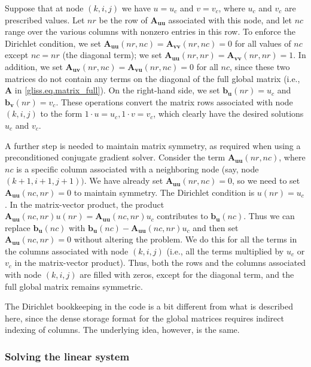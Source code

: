 Suppose that at node $(k,i,j)$ we have $u = u_c$ and $v = v_c$, where $u_c$ and $v_c$ are prescribed values.  
Let $nr$ be the row of $\mathbf{A_{uu}}$ associated with this node, and let $nc$ range over the various
columns with nonzero entries in this row.
To enforce the Dirichlet condition, we set $\mathbf{A_{uu}}(nr,nc) = \mathbf{A_{vv}}(nr,nc) = 0$ for all
values of $nc$ except $nc = nr$ (the diagonal term); we set $\mathbf{A_{uu}}(nr,nr) = \mathbf{A_{vv}}(nr,nr) = 1$.
In addition, we set $\mathbf{A_{uv}}(nr,nc) = \mathbf{A_{vu}}(nr,nc) = 0$ for all $nc$, since these two matrices do not contain
any terms on the diagonal of the full global matrix (i.e., $\mathbf{A}$ in \eqref{gliss.eq.matrix_full}).
On the right-hand side, we set $\mathbf{b_u}(nr) = u_c$ and $\mathbf{b_v}(nr) = v_c$.  These operations
convert the matrix rows associated with node $(k,i,j)$ to the form $1 \cdot u = u_c, 1 \cdot v = v_c$,
which clearly have the desired solutions $u_c$ and $v_c$.

A further step is needed to maintain matrix symmetry, as required
when using a preconditioned conjugate gradient solver.  Consider the term $\mathbf{A_{uu}}(nr,nc)$,
where $nc$ is a specific column associated with a neighboring node (say, node $(k+1,i+1,j+1))$.
We have already set $\mathbf{A_{uu}}(nr,nc) = 0$, so we need to set $\mathbf{A_{uu}}(nc,nr) = 0$ to maintain
symmetry. The Dirichlet condition is $u(nr) = u_c$. 
In the matrix-vector product, the product $\mathbf{A_{uu}}(nc,nr) u(nr) = \mathbf{A_{uu}}(nc,nr) u_c$
contributes to $\mathbf{b_u}(nc)$.  Thus we can replace $\mathbf{b_u}(nc)$ with 
$\mathbf{b_u}(nc) -  \mathbf{A_{uu}}(nc,nr) u_c$
and then set $\mathbf{A_{uu}}(nc,nr) = 0$ without altering the problem.
We do this for all the terms in the columns associated with node $(k,i,j)$ (i.e., all the
terms multiplied by $u_c$ or $v_c$ in the matrix-vector product).
Thus, both the rows and the columns associated with node $(k,i,j)$ are filled with zeros,
except for the diagonal term, and the full global matrix remains symmetric.

The Dirichlet bookkeeping in the code is a bit different from what is described here, since the 
dense storage format for the global matrices requires indirect indexing of columns.
The underlying idea, however, is the same.

\subsubsection{Solving the linear system}

